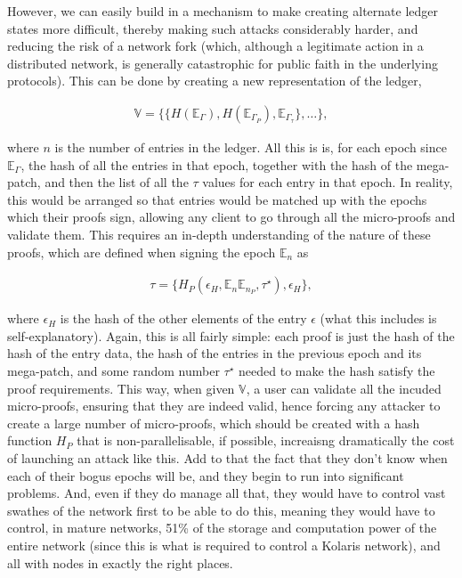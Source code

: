 \documentclass{extreport}
\begin{document}
However, we can easily build in a mechanism to make creating alternate ledger states more difficult, thereby making such attacks considerably harder, and reducing the risk of a network fork (which, although a legitimate action in a distributed network, is generally catastrophic for public faith in the underlying protocols). This can be done by creating a new representation of the ledger,

\begin{align*}
\mathbb{V} = \{ \{ H(\mathbb{E}_\Gamma), H(\mathbb{E}_{\Gamma_P}), \mathbb{E}_{\Gamma_\tau} \}, \ldots \},
\end{align*}

where \(n\) is the number of entries in the ledger. All this is is, for each epoch since \(\mathbb{E}_\Gamma\), the hash of all the entries in that epoch, together with the hash of the mega-patch, and then the list of all the \(\tau\) values for each entry in that epoch. In reality, this would be arranged so that entries would be matched up with the epochs which their proofs sign, allowing any client to go through all the micro-proofs and validate them. This requires an in-depth understanding of the nature of these proofs, which are defined when signing the epoch \(\mathbb{E}_n\) as

\begin{align*}
\tau = \{ H_P(\epsilon_H, \mathbb{E}_n \mathbb{E}_{n_P}, \tau^\star), \epsilon_H \},
\end{align*}

where \(\epsilon_H\) is the hash of the other elements of the entry \(\epsilon\) (what this includes is self-explanatory). Again, this is all fairly simple: each proof is just the hash of the hash of the entry data, the hash of the entries in the previous epoch and its mega-patch, and some random number \(\tau^\star\) needed to make the hash satisfy the proof requirements. This way, when given \(\mathbb{V}\), a user can validate all the incuded micro-proofs, ensuring that they are indeed valid, hence forcing any attacker to create a large number of micro-proofs, which should be created with a hash function \(H_P\) that is non-parallelisable, if possible, increaisng dramatically the cost of launching an attack like this. Add to that the fact that they don't know when each of their bogus epochs will be, and they begin to run into significant problems. And, even if they do manage all that, they would have to control vast swathes of the network first to be able to do this, meaning they would have to control, in mature networks, 51\% of the storage and computation power of the entire network (since this is what is required to control a Kolaris network), and all with nodes in exactly the right places.
\end{document}
